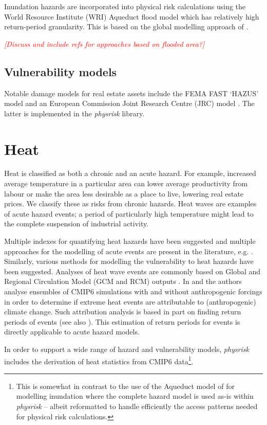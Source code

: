 \documentclass[a4paper,11pt]{extarticle} %
\begin{document}
Inundation hazards are incorporated into physical risk calculations using the World Resource Institute (WRI) Aqueduct flood model \cite{WardEtAl:2020} which has relatively high return-period granularity. This is based on the global modelling approach of \cite{WardEtAl:2013}.

{\textcolor{red}{\emph{[Discuss and include refs for approaches based on flooded area?]}}}

\subsection{Vulnerability models}
Notable damage models for real estate assets include the FEMA FAST `HAZUS' model \cite{ScawthornEtAl:2006} and an European Commission Joint Research Centre (JRC) model \cite{HuizingaEtAl:2017}. The latter is implemented in the \emph{physrisk} library.


\section{Heat}

Heat is classified as both a chronic and an acute hazard.  For example, increased average temperature in a particular area can lower average productivity from labour or make the area less desirable as a place to live, lowering real estate prices. We classify these as risks from chronic hazards. Heat waves are examples of acute hazard events; a period of particularly high temperature might lead to the complete suspension of industrial activity.

Multiple indexes for quantifying heat hazards have been suggested and multiple approaches for the modelling of acute events are present in the literature, e.g. \cite{MazdiyasniEtAl:2019}. Similarly, various methods for modelling the vulnerability to heat hazards have been suggested. Analyses of heat wave events are commonly based on Global and Regional Circulation Model (GCM and RCM) outputs \cite{DosioEtAl:2018}. In \cite{Christidis:2021} and \cite{Christidis:2013} the authors analyse ensembles of CMIP6 simulations with and without anthropogenic forcings in order to determine if extreme heat events are attributable to (anthropogenic) climate change. Such attribution analysis is based in part on finding return periods of events (see also \cite{StottEtAl:2016}). This estimation of return periods for events is directly applicable to acute hazard models.

In order to support a wide range of hazard and vulnerability models,  \emph{physrisk} includes the derivation of heat statistics from CMIP6 data\footnote{This is somewhat in contrast to the use of the Aqueduct model of \cite{WardEtAl:2020} for modelling inundation where the complete hazard model is used as-is within \emph{physrisk} -- albeit reformatted to handle efficiently the access patterns needed for physical risk calculations.}.
\end{document}

